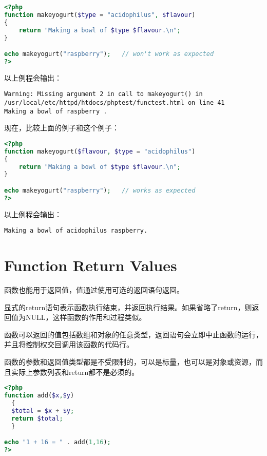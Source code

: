 \begin{lstlisting}[language=PHP]
<?php
function makeyogurt($type = "acidophilus", $flavour)
{
    return "Making a bowl of $type $flavour.\n";
}

echo makeyogurt("raspberry");   // won't work as expected
?>
\end{lstlisting}

以上例程会输出：

\begin{verbatim}
Warning: Missing argument 2 in call to makeyogurt() in 
/usr/local/etc/httpd/htdocs/phptest/functest.html on line 41
Making a bowl of raspberry .
\end{verbatim}


现在，比较上面的例子和这个例子：


\begin{lstlisting}[language=PHP]
<?php
function makeyogurt($flavour, $type = "acidophilus")
{
    return "Making a bowl of $type $flavour.\n";
}

echo makeyogurt("raspberry");   // works as expected
?>
\end{lstlisting}

以上例程会输出：

\begin{verbatim}
Making a bowl of acidophilus raspberry.
\end{verbatim}



\section{Function Return Values}

函数也能用于返回值，值通过使用可选的返回语句返回。

显式的return语句表示函数执行结束，并返回执行结果。如果省略了return，则返回值为NULL，这样函数的作用和过程类似。



函数可以返回的值包括数组和对象的任意类型，返回语句会立即中止函数的运行，并且将控制权交回调用该函数的代码行。

函数的参数和返回值类型都是不受限制的，可以是标量，也可以是对象或资源，而且实际上参数列表和return都不是必须的。

\begin{lstlisting}[language=PHP]
<?php
function add($x,$y)
  {
  $total = $x + $y;
  return $total;
  }

echo "1 + 16 = " . add(1,16);
?>
\end{lstlisting}



